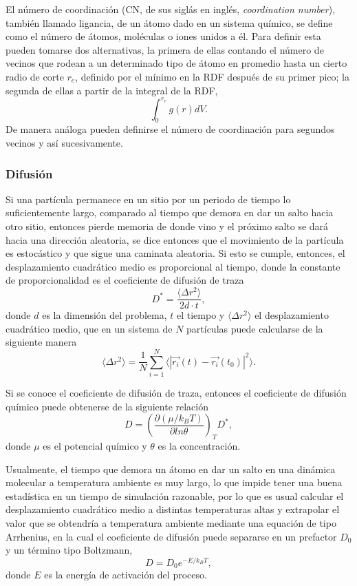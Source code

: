 El número de coordinación (CN, de sus siglás en inglés, \textit{coordination 
number}), también llamado ligancia, de un átomo dado en un sistema químico, se 
define como el número de átomos, moléculas o iones unidos a él. Para definir esta 
pueden tomarse dos alternativas, la primera de ellas contando el número de 
vecinos que rodean a un determinado tipo de átomo en promedio hasta un cierto
radio de corte $r_e$, definido por el mínimo en la RDF después de su primer pico; 
la segunda de ellas a partir de la integral de la RDF,
$$
\int_0^{r_e} g(r) dV.
$$
De manera análoga pueden definirse el número de coordinación para segundos vecinos
y así sucesivamente.

\subsubsection{Difusión}

Si una partícula permanece en un sitio por un periodo de tiempo lo suficientemente 
largo, comparado al tiempo que demora en dar un salto hacia otro sitio, entonces 
pierde memoria de donde vino y el próximo salto se dará hacia una dirección 
aleatoria, se dice entonces que el movimiento de la partícula es estocástico y 
que sigue una caminata aleatoria. Si esto se cumple, entonces, el desplazamiento 
cuadrático medio es proporcional al tiempo, donde la constante de proporcionalidad 
es el coeficiente de difusión de traza
\begin{equation}
    D^{*} = \frac{\langle \Delta r^2 \rangle}{2d\cdot t},
\end{equation}
donde $d$ es la dimensión del problema, $t$ el tiempo y 
$\langle \Delta r^2 \rangle$ el desplazamiento cuadrático medio, que en un sistema 
de $N$ partículas puede calcularse de la siguiente manera
$$
\langle \Delta r^2 \rangle = \frac{1}{N} \sum_{i=1}^{N} \langle |\vec{r_i}(t) - \vec{r_i}(t_0)|^2 \rangle.
$$

Si se conoce el coeficiente de difusión de traza, entonces el coeficiente de 
difusión químico puede obtenerse de la siguiente relación ~\cite{gomer1990}
\begin{equation}
    D = \left( \frac{\partial (\mu / k_BT)}{\partial ln \theta} \right)_T D^{*},
\end{equation}
donde $\mu$ es el potencial químico y $\theta$ es la concentración.

Usualmente, el tiempo que demora un átomo en dar un salto en una dinámica 
molecular a temperatura ambiente es muy largo, lo que impide tener una buena 
estadística en un tiempo de simulación razonable, por lo que es usual calcular 
el desplazamiento cuadrático medio a distintas temperaturas altas y extrapolar
el valor que se obtendría a temperatura ambiente mediante una equación de tipo 
Arrhenius, en la cual el coeficiente de difusión puede separarse en un 
prefactor $D_0$ y un término tipo Boltzmann,
$$
D = D_0 e^{-E / k_BT},
$$
donde $E$ es la energía de activación del proceso. 


